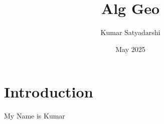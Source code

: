 \documentclass{article}
\title{Alg Geo}
\author{Kumar Satyadarshi}
\date{May 2025}
\begin{document}
\maketitle

\section{Introduction}
My Name is Kumar
\end{document}

